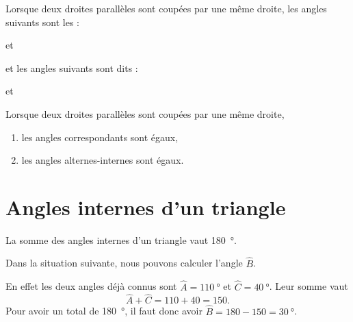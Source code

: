 

\begin{definition}
    Lorsque deux droites parallèles sont coupées par une même droite, les angles suivants sont les  :

\begin{center}
   
   \hfill et\hfill
   
\end{center}

et les angles suivants sont dits  :

\begin{center}
   
   \hfill et\hfill
   
\end{center}

\end{definition}

\begin{propriete}
    Lorsque deux droites parallèles sont coupées par une même droite,
    \begin{enumerate}
        \item
            les angles correspondants sont égaux,
        \item
            les angles alternes-internes sont égaux.
    \end{enumerate}
\end{propriete}

\section{Angles internes d'un triangle}



\begin{theorem}
    La somme des angles internes d'un triangle vaut \SI{180}{\degree}.
\end{theorem}

\begin{example}
    Dans la situation suivante, nous pouvons calculer l'angle \( \hat B\).

    \begin{center}
        
    \end{center}
    
    En effet les deux angles déjà connus sont \( \hat A=\SI{110}{\degree}\) et \( \hat C=\SI{40}{\degree}\). Leur somme vaut
    \begin{equation}
        \hat A+\hat C=110+40=150.
    \end{equation}
    Pour avoir un total de \SI{180}{\degree}, il faut donc avoir \( \hat B=180-150=\SI{30}{\degree}\).
\end{example}

